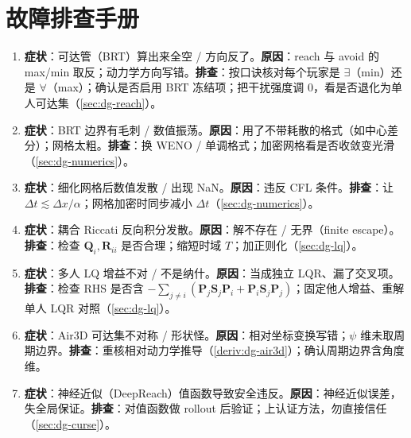 \section*{故障排查手册}
\begin{enumerate}
  \item \textbf{症状}：可达管（BRT）算出来全空 / 方向反了。\textbf{原因}：reach 与 avoid 的 max/min 取反；动力学方向写错。\textbf{排查}：按口诀核对每个玩家是 $\exists$（min）还是 $\forall$（max）；确认是否启用 BRT 冻结项；把干扰强度调 0，看是否退化为单人可达集（\cref{sec:dg-reach}）。
  \item \textbf{症状}：BRT 边界有毛刺 / 数值振荡。\textbf{原因}：用了不带耗散的格式（如中心差分）；网格太粗。\textbf{排查}：换 WENO / 单调格式；加密网格看是否收敛变光滑（\cref{sec:dg-numerics}）。
  \item \textbf{症状}：细化网格后数值发散 / 出现 NaN。\textbf{原因}：违反 CFL 条件。\textbf{排查}：让 $\Delta t\lesssim\Delta x/\alpha$；网格加密时同步减小 $\Delta t$（\cref{sec:dg-numerics}）。
  \item \textbf{症状}：耦合 Riccati 反向积分发散。\textbf{原因}：解不存在 / 无界（finite escape）。\textbf{排查}：检查 $\mathbf Q_i,\mathbf R_{ii}$ 是否合理；缩短时域 $T$；加正则化（\cref{sec:dg-lq}）。
  \item \textbf{症状}：多人 LQ 增益不对 / 不是纳什。\textbf{原因}：当成独立 LQR、漏了交叉项。\textbf{排查}：检查 RHS 是否含 $-\sum_{j\ne i}(\mathbf P_j\mathbf S_j\mathbf P_i+\mathbf P_i\mathbf S_j\mathbf P_j)$；固定他人增益、重解单人 LQR 对照（\cref{sec:dg-lq}）。
  \item \textbf{症状}：Air3D 可达集不对称 / 形状怪。\textbf{原因}：相对坐标变换写错；$\psi$ 维未取周期边界。\textbf{排查}：重核相对动力学推导（\cref{deriv:dg-air3d}）；确认周期边界含角度维。
  \item \textbf{症状}：神经近似（DeepReach）值函数导致安全违反。\textbf{原因}：神经近似误差，失全局保证。\textbf{排查}：对值函数做 rollout 后验证；上认证方法，勿直接信任（\cref{sec:dg-curse}）。
\end{enumerate}
